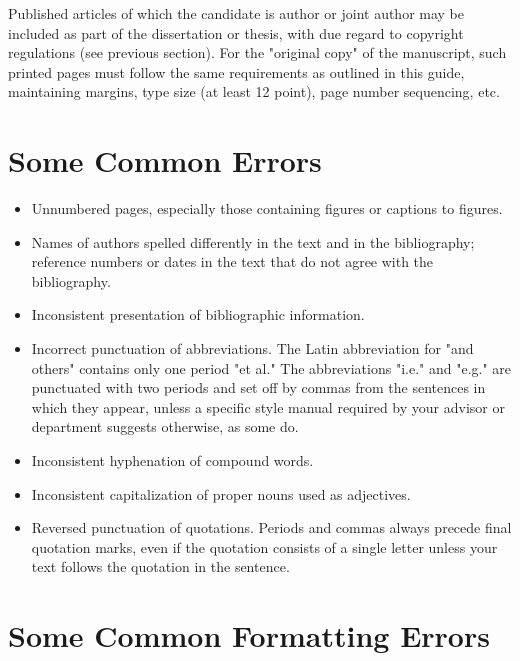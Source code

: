 Published articles of which the candidate is author or joint author may be included as part of the dissertation or thesis, with due regard to copyright regulations (see previous section). For the "original copy" of the manuscript, such printed pages must follow the same requirements as outlined in this guide, maintaining margins, type size (at least 12 point), page number sequencing, etc.

\section{Some Common Errors}

\begin{itemize}
\item Unnumbered pages, especially those containing figures or captions to figures.
\item	Names of authors spelled differently in the text and in the bibliography; reference numbers or dates in the text that do not agree with the bibliography.
\item	Inconsistent presentation of bibliographic information.
\item	Incorrect punctuation of abbreviations.  The Latin abbreviation for "and others" contains only one period "et al."  The abbreviations "i.e." and "e.g." are punctuated with two periods and set off by commas from the sentences in which they appear, unless a specific style manual required by your advisor or department suggests otherwise, as some do.
\item	Inconsistent hyphenation of compound words.
\item	Inconsistent capitalization of proper nouns used as adjectives.
\item	Reversed punctuation of quotations.  Periods and commas always precede final quotation marks, even if the quotation consists of a single letter unless your text follows the quotation in the sentence.

\end{itemize}

\section{Some Common Formatting Errors}

